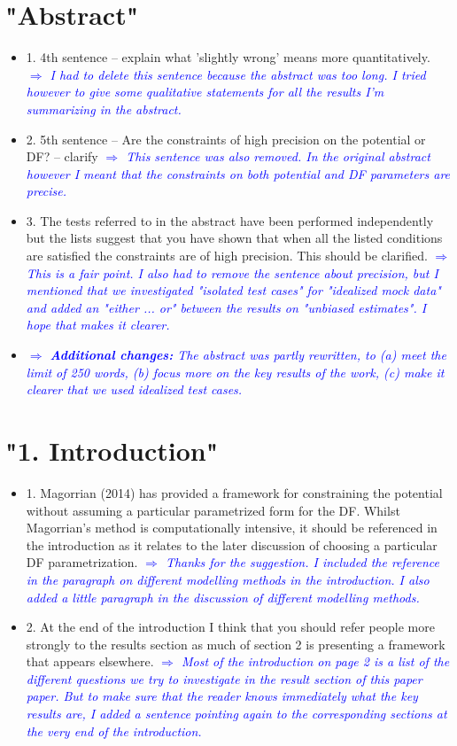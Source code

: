 \documentclass[10pt,a4paper]{article}
\newcommand{\Comment}[1]{\textsl{\textcolor{Blue}{$\Longrightarrow$ {#1}}}}
\begin{document}
\section{"Abstract"}
\begin{itemize}
\item 1. 4th sentence -- explain what 'slightly wrong' means more quantitatively. \Comment{I had to delete this sentence because the abstract was too long. I tried however to give some qualitative statements for all the results I'm summarizing in the abstract.}
\item 2. 5th sentence -- Are the constraints of high precision on the potential or DF? -- clarify \Comment{This sentence was also removed. In the original abstract however I meant that the constraints on both potential and DF parameters are precise.}
\item 3. The tests referred to in the abstract have been performed independently but the lists suggest that you have shown that when all the listed conditions are satisfied the constraints are of high precision. This should be clarified. \Comment{This is a fair point. I also had to remove the sentence about precision, but I mentioned that we investigated "isolated test cases" for "idealized mock data" and added an "either ... or" between the results on "unbiased estimates". I hope that makes it clearer.}
\item \Comment{\textbf{Additional changes:} The abstract was partly rewritten, to (a) meet the limit of 250 words, (b) focus more on the key results of the work, (c) make it clearer that we used idealized test cases.}
\end{itemize}

\section{"1. Introduction"}
\begin{itemize}
\item 1. Magorrian (2014) has provided a framework for constraining the potential without assuming a particular parametrized form for the DF. Whilst Magorrian's method is computationally intensive, it should be referenced in the introduction as it relates to the later discussion of choosing a particular DF parametrization. \Comment{Thanks for the suggestion. I included the reference in the paragraph on different modelling methods in the introduction. I also added a little paragraph in the discussion of different modelling methods.}
\item 2. At the end of the introduction I think that you should refer people more strongly to the results section as much of section 2 is presenting a framework that appears elsewhere. \Comment{Most of the introduction on page 2 is a list of the different questions we try to investigate in the result section of this paper paper. But to make sure that the reader knows immediately what the key results are, I added a sentence pointing again to the corresponding sections at the very end of the introduction.}
\end{itemize}
\end{document}
